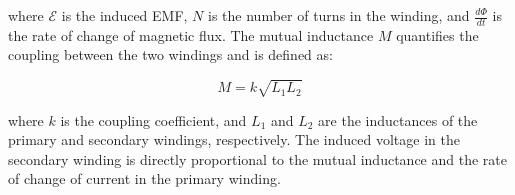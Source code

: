 where \(\mathcal{E}\) is the induced EMF, \(N\) is the number of turns in the winding, and \(\frac{d\Phi}{dt}\) is the rate of change of magnetic flux. The mutual inductance \(M\) quantifies the coupling between the two windings and is defined as:

\[
M = k \sqrt{L_1 L_2}
\]

where \(k\) is the coupling coefficient, and \(L_1\) and \(L_2\) are the inductances of the primary and secondary windings, respectively. The induced voltage in the secondary winding is directly proportional to the mutual inductance and the rate of change of current in the primary winding.


